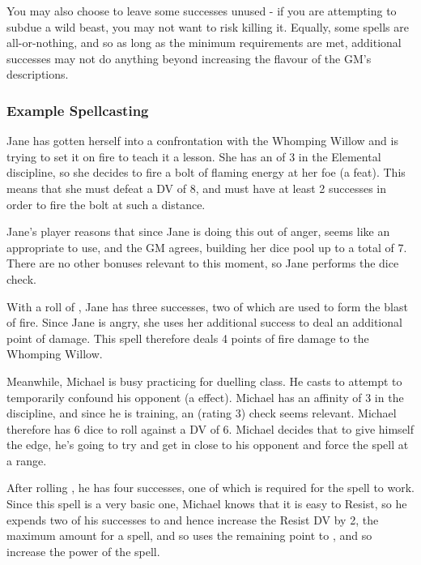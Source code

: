 You may also choose to leave some successes unused - if you are attempting to subdue a wild beast, you may not want to risk killing it. Equally, some spells are all-or-nothing, and so as long as the minimum requirements are met, additional successes may not do anything beyond increasing the flavour of the GM's descriptions. 

\subsubsection{Example Spellcasting}

Jane has gotten herself into a confrontation with the Whomping Willow and is trying to set it on fire to teach it a lesson. She has an  of 3 in the Elemental discipline, so she decides to fire a bolt of flaming energy at her foe (a \levelThree{} feat). This means that she must defeat a DV of 8, and must have at least 2 successes in order to fire the bolt at such a distance. 

Jane's player reasons that since Jane is doing this out of anger,  seems like an appropriate  to use, and the GM agrees, building her dice pool up to a total of 7. There are no other bonuses relevant to this moment, so Jane performs the dice check. 

With a roll of , Jane has three successes, two of which are used to form the blast of fire. Since Jane is angry, she uses her additional success to deal an additional point of damage. This spell therefore deals 4 points of fire damage to the Whomping Willow. 

Meanwhile, Michael is busy practicing for duelling class. He casts  to attempt to temporarily confound his opponent (a \levelOne{} effect). Michael has an affinity of 3 in the  discipline, and since he is training, an  (rating 3) check seems relevant. Michael therefore has 6 dice to roll against a DV of 6. Michael decides that to give himself the edge, he's going to try and get in close to his opponent and force the spell at a  range. 

After rolling , he has four successes, one of which is required for the spell to work. Since this spell is a very basic one, Michael knows that it is easy to Resist, so he expends two of his successes to  and hence increase the Resist DV by 2, the maximum amount for a \levelOne{} spell, and so uses the remaining point to , and so increase the power of the spell.




